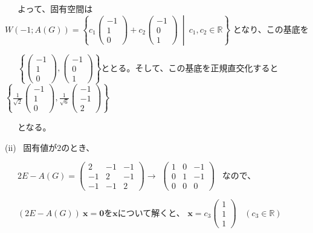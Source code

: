 \documentclass{jsarticle}
\begin{document}
 \ \ \ よって、固有空間は$W(-1;A(G)) = \left\{c_1\begin{pmatrix} -1 \\ 1 \\ 0 \end{pmatrix} + c_2\begin{pmatrix} -1 \\ 0 \\ 1 \end{pmatrix} \ \middle| \ c_1, c_2 \in \mathbb{R} \right\}$
となり、この基底を

 \ \ \ $\left\{\begin{pmatrix} -1 \\ 1 \\ 0 \end{pmatrix} , \begin{pmatrix} -1 \\ 0 \\ 1 \end{pmatrix} \right\}$ととる。そして、この基底を正規直交化すると
$\left\{\displaystyle \frac{1}{\sqrt{2}}\begin{pmatrix} -1 \\ 1 \\ 0 \end{pmatrix} , \displaystyle \frac{1}{\sqrt{6}}\begin{pmatrix} -1 \\ -1 \\ 2 \end{pmatrix} \right\}$

\bigskip

 \ \ \ となる。

\bigskip
\bigskip

(i\hspace{-0.5pt}i) \ 固有値が$2$のとき、

 \ \ \ $2E-A(G) = \begin{pmatrix} 2&-1&-1 \\ -1&2&-1 \\ -1&-1&2 \end{pmatrix} \longrightarrow$
$\begin{pmatrix} 1&0&-1 \\ 0&1&-1 \\ 0&0&0 \end{pmatrix}$ \ なので、

 \ \ \ $(2E-A(G)) \ \bm{x} = \bm{0}を\bm{x}$について解くと、
$\bm{x} = c_3 \begin{pmatrix} 1 \\ 1 \\ 1 \end{pmatrix} \ \ \ \ (c_3 \in \mathbb{R})$
\end{document}
